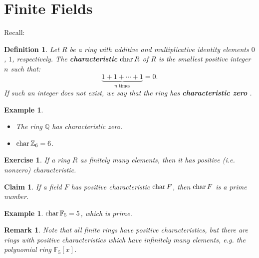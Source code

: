 \documentclass[a4paper,12pt]{report}
\newcounter{statement}
\numberwithin{statement}{chapter}
\newtheorem{defn}[statement]{Definition}
\newtheorem{claim}[statement]{Claim}
\newtheorem{eg}[statement]{\bf Example}
\newtheorem{ex}[statement]{\bf Exercise}
\newtheorem*{remark}{\bf Remark}
\numberwithin{equation}{chapter}
\numberwithin{section}{chapter}
\numberwithin{subsection}{section}
\begin{document}
\section{Finite Fields}




Recall:
\begin{defn}
Let $R$ be a ring with additive and multiplicative identity elements $0$, $1$,
respectively.
The  {\bf characteristic}  ${\rm char}\, R$ of $R$ is the smallest positive integer $n$
such that:
\[
\underbrace{1 + 1 + \cdots + 1}_{n \text{ times}} = 0.
\]
If such an integer does not exist, we say that the ring has  {\bf characteristic zero} .
\end{defn}







\begin{eg}
\begin{itemize}
\item 
The ring $\mathbb{Q}$ has characteristic zero.

\item 
${\rm char}\, \mathbb{Z}_6 = 6$.
\end{itemize}
\end{eg}



\begin{ex}

If a ring $R$ as finitely many elements, then it has positive (i.e. nonzero) characteristic.

\end{ex}



\begin{claim}

If a field $F$ has positive characteristic ${\rm char}\, F$,
then ${\rm char}\, F$ is a prime number.
\end{claim}



\begin{eg}

${\rm char}\,\mathbb{F}_5 = 5$,
which is prime.

\end{eg}



\begin{remark}

Note that all finite rings have positive characteristics,
but there are rings with positive characteristics which have infinitely many elements,
e.g. the polynomial ring $\mathbb{F}_5[x]$.

\end{remark}
\end{document}
